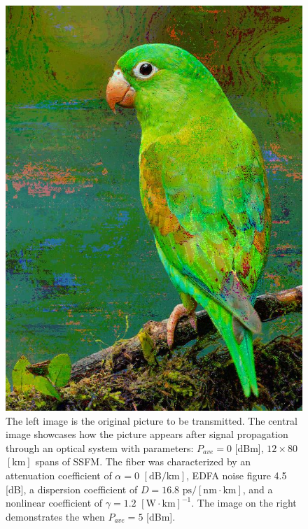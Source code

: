 \begin{figure}[ht]
\begin{minipage}[c]{0.33\linewidth}
    \includegraphics[width=1.\linewidth]{images/hpcom/parrot3_rx2.jpg}
  \end{minipage}
  \caption{
  The left image is the original picture to be transmitted. The central image showcases how the picture appears after signal propagation through an optical system with parameters: $P_{ave}=0$ \textrm{[dBm]}, $12 \times 80$ $[\textrm{km}]$ spans of SSFM. The fiber was characterized by an attenuation coefficient of $\alpha = 0$ $[\textrm{dB}/\textrm{km}]$, EDFA noise figure 4.5 \textrm{[dB]}, a dispersion coefficient of $D = 16.8$ $\textrm{ps}/[\textrm{nm} \cdot \textrm{km}]$, and a nonlinear coefficient of $\gamma = 1.2$ $[\textrm{W} \cdot \textrm{km}]^{-1}$. The image on the right demonstrates the when $P_{ave} = 5$ \textrm{[dBm]}.
  }
  \label{fig:demo_example}
\end{figure}

